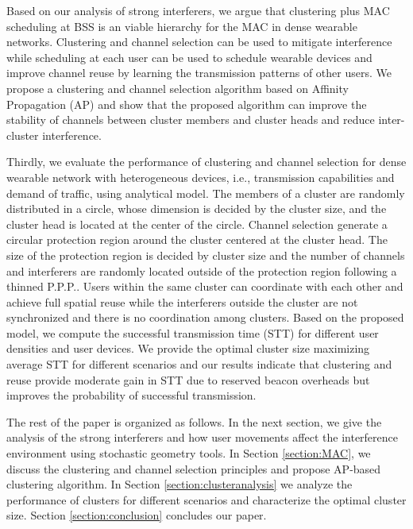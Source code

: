 \documentclass[10pt, conference, letterpaper]{IEEEtran}
\begin{document}
Based on our analysis of strong interferers, we argue that clustering plus MAC scheduling at BSS is an viable hierarchy for the MAC in dense wearable networks. Clustering and channel selection can be used to mitigate interference while scheduling at each user can be used to schedule wearable devices and improve channel reuse by learning the transmission patterns of other users. We propose a clustering and channel selection algorithm based on Affinity Propagation (AP) and show that the proposed algorithm can improve the stability of channels between cluster members and cluster heads and reduce inter-cluster interference. 

Thirdly, we evaluate the performance of clustering and channel selection for dense wearable network with heterogeneous devices, i.e., transmission capabilities and demand of traffic, using analytical model. The members of a cluster are randomly distributed in a circle, whose dimension is decided by the cluster size, and the cluster head is located at the center of the circle. Channel selection generate a circular protection region around the cluster centered at the cluster head. The size of the protection region is decided by cluster size and the number of channels and interferers are randomly located outside of the protection region following a thinned P.P.P.. Users within the same cluster can coordinate with each other and achieve full spatial reuse while the interferers outside the cluster are not synchronized and there is no coordination among clusters. Based on the proposed model, we compute the successful transmission time (STT) for different user densities and user devices. We provide the optimal cluster size maximizing average STT for different scenarios and our results indicate that clustering and reuse provide moderate gain in STT due to reserved beacon overheads but improves the probability of successful transmission. 

The rest of the paper is organized as follows. In the next section, we give the analysis of the strong interferers and how user movements affect the interference environment using stochastic geometry tools. In Section \ref{section:MAC}, we discuss the clustering and channel selection principles and propose AP-based clustering algorithm. In Section \ref{section:clusteranalysis} we analyze the performance of clusters for different scenarios and characterize the optimal cluster size. Section \ref{section:conclusion} concludes our paper. 
\end{document}
